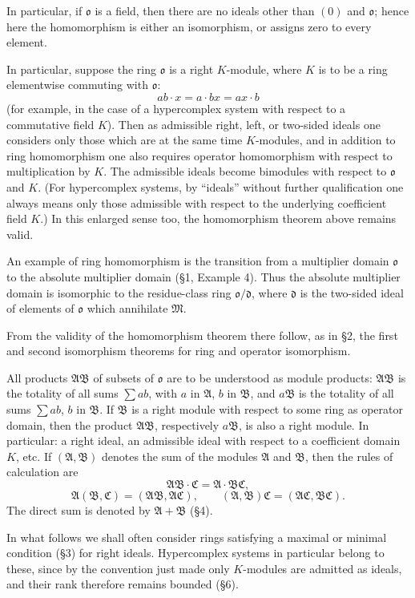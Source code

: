 \documentclass[11pt]{article}
\providecommand{\mA}{\mathfrak{A}}
\providecommand{\mB}{\mathfrak{B}}
\providecommand{\mC}{\mathfrak{C}}
\providecommand{\mM}{\mathfrak{M}}
\providecommand{\mo}{\mathfrak{o}}
\providecommand{\md}{\mathfrak{d}}
\begin{document}
In particular, if $\mo$ is a field, then there are no ideals other than $(0)$ and $\mo$; hence here the homomorphism is either an isomorphism, or assigns zero to every element.

In particular, suppose the ring $\mo$ is a right $K$-module, where $K$ is to be a ring elementwise commuting with $\mo$:
\[
        ab\cdot x=a\cdot bx=ax\cdot b
\]
(for example, in the case of a hypercomplex system with respect to a commutative field $K$). Then as admissible right, left, or two-sided ideals one considers only those which are at the same time $K$-modules, and in addition to ring homomorphism one also requires operator homomorphism with respect to multiplication by $K$. The admissible ideals become bimodules with respect to $\mo$ and $K$. (For hypercomplex systems, by ``ideals'' without further qualification one always means only those admissible with respect to the underlying coefficient field $K$.) In this enlarged sense too, the homomorphism theorem above remains valid.

An example of ring homomorphism is the transition from a multiplier domain $\mo$ to the absolute multiplier domain (§1, Example 4). Thus the absolute multiplier domain is isomorphic to the residue-class ring $\mo/\md$, where $\md$ is the two-sided ideal of elements of $\mo$ which annihilate $\mM$.

From the validity of the homomorphism theorem there follow, as in §2, the first and second isomorphism theorems for ring and operator isomorphism.

All products $\mA\mB$ of subsets of $\mo$ are to be understood as module products: $\mA\mB$ is the totality of all sums $\sum ab$, with $a$ in $\mA$, $b$ in $\mB$, and $a\mB$ is the totality of all sums $\sum ab$, $b$ in $\mB$. If $\mB$ is a right module with respect to some ring as operator domain, then the product $\mA\mB$, respectively $a\mB$, is also a right module. In particular: a right ideal, an admissible ideal with respect to a coefficient domain $K$, etc. If $(\mA,\mB)$ denotes the sum of the modules $\mA$ and $\mB$, then the rules of calculation are
\[
        \mA\mB\cdot\mC=\mA\cdot\mB\mC,
\]
\[
        \mA(\mB,\mC)=(\mA\mB,\mA\mC),
        \qquad
        (\mA,\mB)\mC=(\mA\mC,\mB\mC).
\]
The direct sum is denoted by $\mA+\mB$ (§4).

In what follows we shall often consider rings satisfying a maximal or minimal condition (§3) for right ideals. Hypercomplex systems in particular belong to these, since by the convention just made only $K$-modules are admitted as ideals, and their rank therefore remains bounded (§6).
\end{document}

